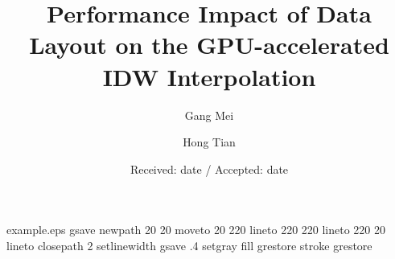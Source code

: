 \begin{filecontents*}{example.eps}
gsave
newpath
  20 20 moveto
  20 220 lineto
  220 220 lineto
  220 20 lineto
closepath
2 setlinewidth
gsave
  .4 setgray fill
grestore
stroke
grestore
\end{filecontents*}
\RequirePackage{fix-cm}
\documentclass[twocolumn]{svjour3}          \smartqed  \usepackage{graphicx}

\usepackage{times}
\usepackage{subfigure}
\usepackage[hyphens]{url}

\usepackage{enumitem}
\renewcommand{\labelitemi}{$\bullet$}

\usepackage[
bookmarksnumbered = true,
bookmarksopen = true,
bookmarksopenlevel=3,
pdftitle={Performance Impact of Data Layout on the GPU-accelerated IDW Interpolation},
pdfauthor={Gang Mei},
pdfstartview = FitH,
colorlinks=true,
linkcolor=blue,
breaklinks=true,
urlcolor=black,
citecolor=blue
]{hyperref}



\title{Performance Impact of Data Layout on the GPU-accelerated \\IDW Interpolation}


\author{Gang Mei         \and
        Hong Tian   
}



\date{Received: date / Accepted: date}


\maketitle

